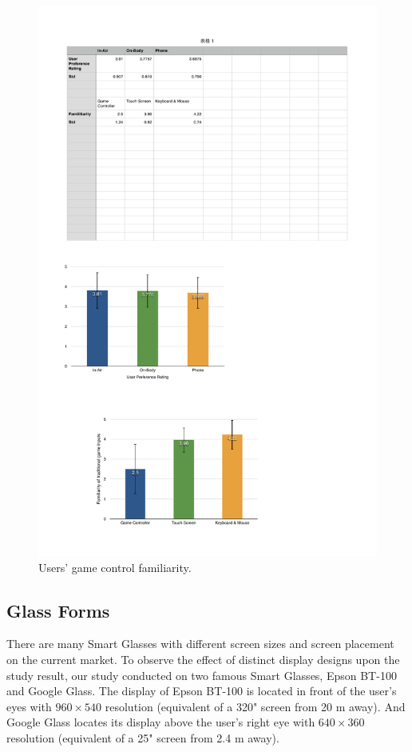 \documentclass{sigchi}
\begin{document}
  \begin{figure}[!h]
  \centering
  \includegraphics[width=0.9\columnwidth]{Familiarity}
  \caption{Users' game control familiarity.}
  \label{fig:figureFamiliarity}
  \end{figure}   

  \subsection {Glass Forms}
  There are many Smart Glasses with different screen sizes and screen placement on the current market. To observe the effect of distinct display designs upon the study result, our study conducted on two famous Smart Glasses, Epson BT-100 and Google Glass. The display of Epson BT-100 is located in front of the user's eyes with $960 \times 540$ resolution (equivalent of a 320" screen from 20 m away)\cite{BT100}. And Google Glass locates its display above the user's right eye with $640 \times 360$ resolution (equivalent of a 25" screen from 2.4 m away)\cite{GoogleGlass}.       
\end{document}
